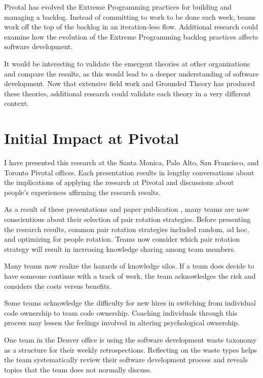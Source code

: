 Pivotal has evolved the Extreme Programming practices for building and managing a backlog. Instead of committing to work to be done each week, teams work off the top of the backlog in an iteration-less flow. Additional research could examine how the evolution of the Extreme Programming backlog practices affects software development.

It would be interesting to validate the emergent theories at other organizations and compare the results, as this would lead to a deeper understanding of software development. Now that extensive field work and Grounded Theory has produced these theories, additional research could validate each theory in a very different context.

\section{Initial Impact at Pivotal}
I have presented this research at the Santa Monica, Palo Alto, San Francisco, and Toronto Pivotal offices. Each presentation results in lengthy conversations about the implications of applying the research at Pivotal and discussions about people's experiences affirming the research results. 

As a result of these presentations and paper publication \cite{SedanoTeamCodeOwnership, SedanoSustainableSoftware, SedanoSoftwareDevelopmentWaste}, many teams are now conscientious about their selection of pair rotation strategies. Before presenting the research results, common pair rotation strategies included random, ad hoc, and optimizing for people rotation. Teams now consider which pair rotation strategy will result in increasing knowledge sharing among team members.

Many teams now realize the hazards of knowledge silos. If a team does decide to have someone continue with a track of work, the team acknowledges the risk and considers the costs versus benefits.

Some teams acknowledge the difficulty for new hires in switching from individual code ownership to team code ownership. Coaching individuals through this process may lessen the feelings involved in altering psychological ownership. 

One team in the Denver office is using the software development waste taxonomy as a structure for their weekly retrospections.  Reflecting on the waste types helps the team systematically review their software development process and reveals topics that the team does not normally discuss.

